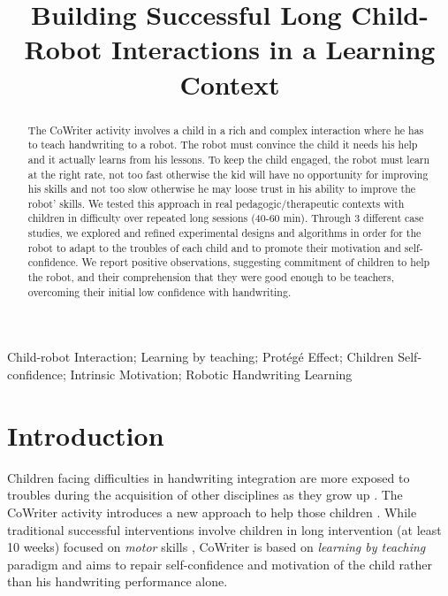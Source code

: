 \documentclass[conference]{IEEEtran}
\begin{document}
\title{Building Successful Long Child-Robot Interactions in a Learning Context}

\author{
}

\maketitle
\begin{abstract}

The CoWriter activity involves a child in a rich and complex interaction where he has to
teach handwriting to a robot. The robot must convince the child it needs his help and it
actually learns from his lessons. To keep the child engaged, 
the robot must learn at the right rate, not too fast otherwise the kid will have
no opportunity for improving his skills and not too slow otherwise he may loose
trust in his ability to improve the robot' skills.
We tested this approach in real pedagogic/therapeutic contexts with
children in difficulty over repeated long sessions (40-60 min). Through 3 different
case studies, we explored and refined experimental designs and algorithms in
order for the robot to adapt to the
troubles of each child and to promote their motivation and self-confidence. We report positive observations, suggesting commitment of children to help the
robot, and their comprehension that they were good enough to be teachers,
overcoming their initial low confidence with handwriting.

\end{abstract}

\begin{IEEEkeywords}
Child-robot Interaction; Learning by teaching; Protégé Effect; Children Self-confidence; Intrinsic Motivation; Robotic Handwriting Learning
\end{IEEEkeywords}

\section{Introduction}

Children facing difficulties in handwriting integration are more exposed
to troubles during the acquisition of other disciplines as they grow up
\cite{Christensen2005}. 
The CoWriter activity introduces a new approach to help those children
\cite{Hood}. While traditional successful interventions involve children
in long intervention (at least 10 weeks) focused on \emph{motor} skills \cite{Hoy2011},
CoWriter is based on \emph{learning by teaching} paradigm and aims to repair
self-confidence and motivation of the child rather than his handwriting performance alone.
\end{document}
